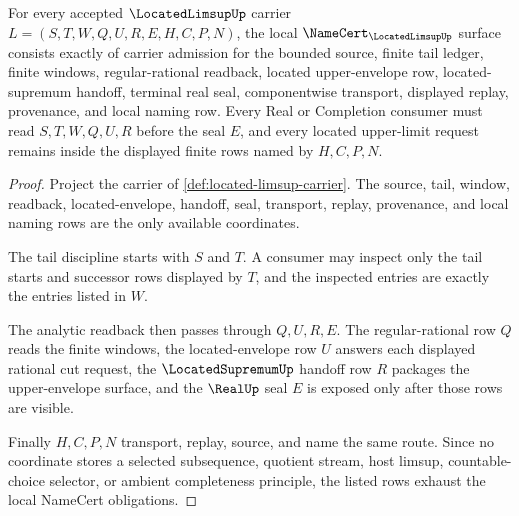 \begin{theorem}
\label{thm:located-limsup-namecert-obligations}
For every accepted $\LocatedLimsupUp$ carrier $L=(S,T,W,Q,U,R,E,H,C,P,N)$, the local $\NameCert_{\LocatedLimsupUp}$ surface consists exactly of carrier admission for the bounded source, finite tail ledger, finite windows, regular-rational readback, located upper-envelope row, located-supremum handoff, terminal real seal, componentwise transport, displayed replay, provenance, and local naming row. Every Real or Completion consumer must read $S,T,W,Q,U,R$ before the seal $E$, and every located upper-limit request remains inside the displayed finite rows named by $H,C,P,N$.
\end{theorem}
\begin{proof}
Project the carrier of \autoref{def:located-limsup-carrier}. The source, tail, window, readback, located-envelope, handoff, seal, transport, replay, provenance, and local naming rows are the only available coordinates.

The tail discipline starts with $S$ and $T$. A consumer may inspect only the tail starts and successor rows displayed by $T$, and the inspected entries are exactly the entries listed in $W$.

The analytic readback then passes through $Q,U,R,E$. The regular-rational row $Q$ reads the finite windows, the located-envelope row $U$ answers each displayed rational cut request, the $\LocatedSupremumUp$ handoff row $R$ packages the upper-envelope surface, and the $\RealUp$ seal $E$ is exposed only after those rows are visible.

Finally $H,C,P,N$ transport, replay, source, and name the same route. Since no coordinate stores a selected subsequence, quotient stream, host limsup, countable-choice selector, or ambient completeness principle, the listed rows exhaust the local NameCert obligations.
\end{proof}



